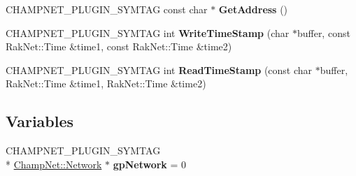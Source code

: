 \begin{DoxyCompactItemize}
\item 
\hypertarget{namespace_champ_net_plugin_af5f2e2b6f71b6e0ddca62b9d7ed7e272}{C\-H\-A\-M\-P\-N\-E\-T\-\_\-\-P\-L\-U\-G\-I\-N\-\_\-\-S\-Y\-M\-T\-A\-G const char $\ast$ {\bfseries Get\-Address} ()}\label{namespace_champ_net_plugin_af5f2e2b6f71b6e0ddca62b9d7ed7e272}

\item 
\hypertarget{namespace_champ_net_plugin_aa96d47e69a072b231173aa4c85aa398e}{C\-H\-A\-M\-P\-N\-E\-T\-\_\-\-P\-L\-U\-G\-I\-N\-\_\-\-S\-Y\-M\-T\-A\-G int {\bfseries Write\-Time\-Stamp} (char $\ast$buffer, const Rak\-Net\-::\-Time \&time1, const Rak\-Net\-::\-Time \&time2)}\label{namespace_champ_net_plugin_aa96d47e69a072b231173aa4c85aa398e}

\item 
\hypertarget{namespace_champ_net_plugin_a5ad9510066afac2127464e36a72bc9b0}{C\-H\-A\-M\-P\-N\-E\-T\-\_\-\-P\-L\-U\-G\-I\-N\-\_\-\-S\-Y\-M\-T\-A\-G int {\bfseries Read\-Time\-Stamp} (const char $\ast$buffer, Rak\-Net\-::\-Time \&time1, Rak\-Net\-::\-Time \&time2)}\label{namespace_champ_net_plugin_a5ad9510066afac2127464e36a72bc9b0}

\end{DoxyCompactItemize}
\subsection*{Variables}
\begin{DoxyCompactItemize}
\item 
\hypertarget{namespace_champ_net_plugin_a6f246146f350188f1518f4dedb72f374}{C\-H\-A\-M\-P\-N\-E\-T\-\_\-\-P\-L\-U\-G\-I\-N\-\_\-\-S\-Y\-M\-T\-A\-G \\*
\hyperlink{class_champ_net_1_1_network}{Champ\-Net\-::\-Network} $\ast$ {\bfseries gp\-Network} = 0}\label{namespace_champ_net_plugin_a6f246146f350188f1518f4dedb72f374}

\end{DoxyCompactItemize}
